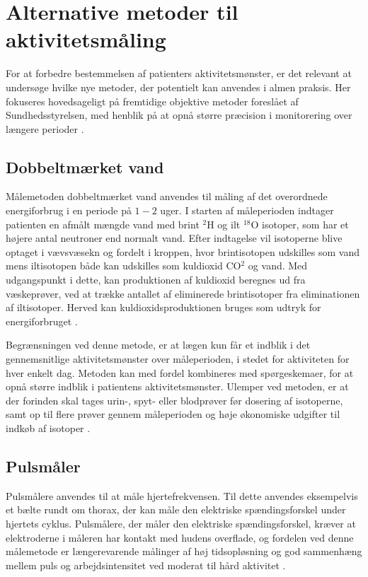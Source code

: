 \section{Alternative metoder til aktivitetsmåling}

For at forbedre bestemmelsen af patienters aktivitetsmønster, er det relevant at undersøge hvilke nye metoder, der potentielt kan anvendes i almen praksis. Her fokuseres hovedsageligt på fremtidige objektive metoder foreslået af Sundhedsstyrelsen, med henblik på at opnå større præcision i monitorering over længere perioder \citep{motionsraad2007}.

\subsection{Dobbeltmærket vand}

Målemetoden dobbeltmærket vand anvendes til måling af det overordnede energiforbrug i en periode på $1-2$ uger. I starten af måleperioden indtager patienten en afmålt mængde vand med brint  $^2$H og ilt $^{18}$O isotoper, som har et højere antal neutroner end normalt vand. Efter indtagelse vil isotoperne blive optaget i vævsvæsekn og fordelt i kroppen, hvor brintisotopen udskilles som vand mens iltisotopen både kan udskilles som kuldioxid CO$^2$ og vand. Med udgangspunkt i dette, kan produktionen af kuldioxid beregnes ud fra væskeprøver, ved at trække antallet af eliminerede brintisotoper fra eliminationen af iltisotoper. Herved kan kuldioxidsproduktionen bruges som udtryk for energiforbruget \citep{motionsraad2007,pedersen2011}.

Begrænsningen ved denne metode, er at lægen kun får et indblik i det gennemsnitlige aktivitetsmønster over måleperioden, i stedet for aktiviteten for hver enkelt dag. Metoden kan med fordel kombineres med spørgeskemaer, for at opnå større indblik i patientens aktivitetsmønster. Ulemper ved metoden, er at der forinden skal tages urin-, spyt- eller blodprøver før dosering af isotoperne, samt op til flere prøver gennem måleperioden og høje økonomiske udgifter til indkøb af isotoper \citep{motionsraad2007}.

\subsection{Pulsmåler}

Pulsmålere anvendes til at måle hjertefrekvensen. Til dette anvendes eksempelvis et bælte rundt om thorax, der kan måle den elektriske spændingsforskel under hjertets cyklus. Pulsmålere, der måler den elektriske spændingsforskel, kræver at elektroderne i måleren har kontakt med hudens overflade, og fordelen ved denne målemetode er længerevarende målinger af høj tidsopløsning og god sammenhæng mellem puls og arbejdsintensitet ved moderat til hård aktivitet \citep{motionsraad2007}. 

